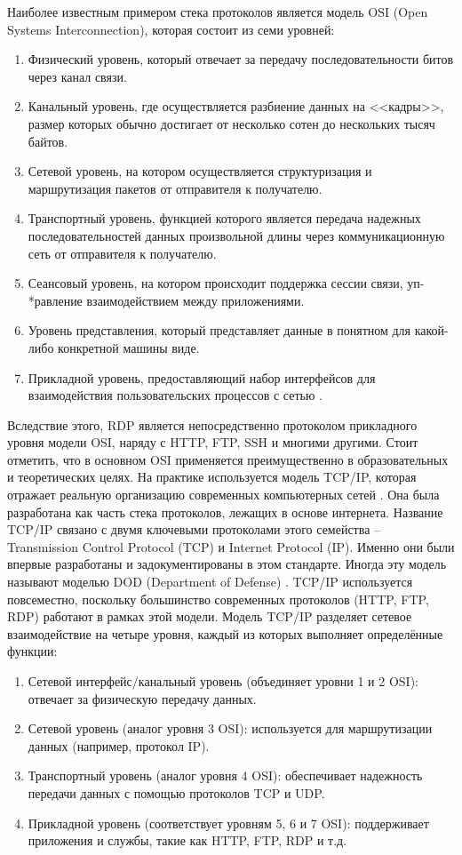 \documentclass[spec, och, diploma]{SCWorks}
\begin{document}
Наиболее известным примером стека протоколов является модель OSI (Open Systems Interconnection), которая состоит из семи уровней:

\begin{enumerate}
  \item Физический уровень, который отвечает за передачу последовательности битов через канал связи.
  \item Канальный уровень, где осуществляется разбиение данных на <<кадры>>, размер которых обычно достигает
  от несколько сотен до нескольких тысяч байтов.
  \item Сетевой уровень, на котором осуществляется структуризация и маршрутизация пакетов от отправителя к получателю.
  \item Транспортный уровень, функцией которого является передача надежных последовательностей данных произвольной
  длины через коммуникационную сеть от отправителя к получателю.
  \item Сеансовый уровень, на котором происходит поддержка сессии связи, уп-\\*равление взаимодействием между приложениями.  
  \item Уровень представления, который представляет данные в понятном для какой-либо конкретной машины виде.
  \item Прикладной уровень, предоставляющий набор интерфейсов для взаимодействия пользовательских процессов с сетью \cite{osi-model}.
\end{enumerate}

Вследствие этого, RDP является непосредственно протоколом прикладного уровня модели OSI, наряду с HTTP, FTP, SSH и многими другими. Стоит отметить, что 
в основном OSI применяется преимущественно в образовательных и теоретических целях. На практике используется модель TCP/IP, которая отражает
реальную организацию современных компьютерных сетей \cite{stack}. Она была разработана как часть стека протоколов, лежащих в основе интернета. 
Название TCP/IP связано с двумя ключевыми протоколами этого семейства -- Transmission Control Protocol (TCP) и Internet Protocol (IP). Именно они 
были впервые разработаны и задокументированы в этом стандарте. Иногда эту модель называют моделью DOD (Department of Defense) \cite{tcpip}.
TCP/IP используется повсеместно, поскольку большинство современных протоколов (HTTP, FTP, RDP) работают в рамках этой модели. Модель TCP/IP 
разделяет сетевое взаимодействие на четыре уровня, каждый из которых выполняет определённые функции:

\begin{enumerate}
    \item Сетевой интерфейс/канальный уровень (объединяет уровни 1 и 2 OSI): отвечает за физическую передачу данных.
    \item Сетевой уровень (аналог уровня 3 OSI): используется для маршрутизации данных (например, протокол IP).
    \item Транспортный уровень (аналог уровня 4 OSI): обеспечивает надежность передачи данных с помощью протоколов TCP и UDP.
    \item Прикладной уровень (соответствует уровням 5, 6 и 7 OSI): поддерживает приложения и службы, такие как HTTP, FTP, RDP и т.д.
\end{enumerate}
\end{document}
